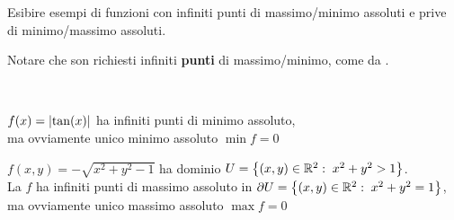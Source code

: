 \begin{exercise}
	\label{ex:f_con_inf_pti_max_min_abs}
	Esibire esempi di funzioni con infiniti punti di massimo/minimo assoluti e prive di minimo/massimo assoluti.
	\begin{note}
		Notare che son richiesti infiniti \textbf{punti} di massimo/minimo, come da .
	\end{note}
	\begin{solution}\hfill\\
		\vspace*{\baselineskip}
		\begin{minipage}{0.49\linewidth}
			\begin{center}
				$f(x) = \left|\tan(x)\right|$ ha infiniti punti di minimo assoluto,\\
				ma ovviamente unico minimo assoluto $\min f = 0$
			\end{center}
		\end{minipage}
		\begin{minipage}{0.49\linewidth}
			\begin{center}
				$f(x,y) = -\sqrt{x^2+y^2-1}$ ha dominio $U = \left\{(x, y) \in \mathbb{R}^2:\; x^2 + y^2 > 1\right\}$.\\
				La $f$ ha infiniti punti di massimo assoluto in $\partial U = \left\{(x, y) \in \mathbb{R}^2:\; x^2 + y^2 = 1\right\}$,\\
				ma ovviamente unico massimo assoluto $\max f = 0$
			\end{center}
		\end{minipage}\\
		\vspace*{\baselineskip}
		\begin{minipage}{0.49\linewidth}
			\begin{center}
\end{center}
\end{minipage}
\end{solution}
\end{exercise}
